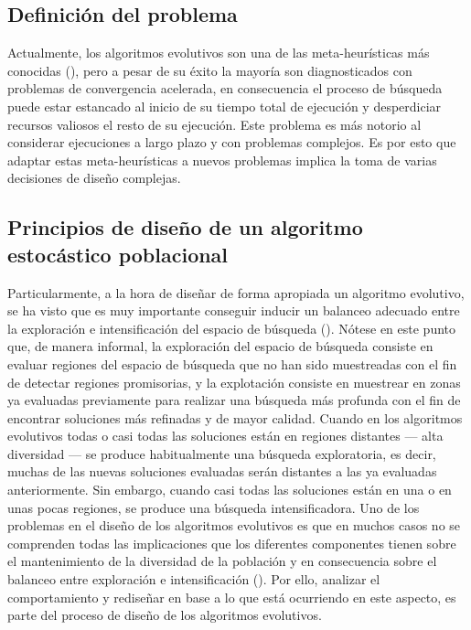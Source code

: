 \subsection{Definición del problema}

Actualmente, los algoritmos evolutivos son una de las meta-heurísticas más conocidas (\cite{glover2005handbook}), pero a pesar de su éxito la mayoría son diagnosticados con problemas de convergencia acelerada, en consecuencia el proceso de búsqueda puede estar estancado al inicio de su tiempo total de ejecución y desperdiciar recursos valiosos el resto de su ejecución.
%
Este problema es más notorio al considerar ejecuciones a largo plazo y con problemas complejos.
%
Es por esto que adaptar estas meta-heurísticas a nuevos problemas implica la toma de varias decisiones de diseño complejas.
%
\subsection{Principios de diseño de un algoritmo estocástico poblacional}

Particularmente, a la hora de diseñar de forma apropiada un algoritmo evolutivo, se ha visto que es muy importante conseguir inducir un balanceo adecuado entre la exploración e intensificación del espacio de búsqueda (\cite{herrera1996adaptation}).
%
Nótese en este punto que, de manera informal, la exploración del espacio de búsqueda consiste en evaluar regiones del espacio de búsqueda que no han sido muestreadas con el fin de detectar regiones promisorias, y la explotación consiste en muestrear en zonas ya evaluadas previamente para realizar una búsqueda más profunda con el fin de encontrar soluciones más refinadas y de mayor calidad.
%
Cuando en los algoritmos evolutivos todas o casi todas las soluciones están en regiones distantes --- alta diversidad --- se produce habitualmente una búsqueda exploratoria, 
es decir, muchas de las nuevas soluciones evaluadas serán distantes a las ya evaluadas anteriormente.
%
Sin embargo, cuando casi todas las soluciones están en una o en unas pocas regiones, se produce una búsqueda intensificadora.
%
Uno de los problemas en el diseño de los algoritmos evolutivos es que en muchos casos no se comprenden todas las implicaciones que los diferentes componentes tienen sobre el mantenimiento de la diversidad de la población y en consecuencia sobre el balanceo entre exploración e intensificación (\cite{Crepinsek:13}).
%
Por ello, analizar el comportamiento y rediseñar en base a lo que está ocurriendo en este aspecto, es parte del proceso de diseño de los algoritmos evolutivos.

